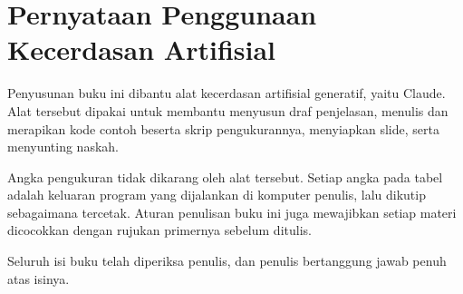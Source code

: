\chapter{Pernyataan Penggunaan Kecerdasan Artifisial}

Penyusunan buku ini dibantu alat kecerdasan artifisial generatif, yaitu Claude.
Alat tersebut dipakai untuk membantu menyusun draf penjelasan, menulis dan
merapikan kode contoh beserta skrip pengukurannya, menyiapkan slide, serta
menyunting naskah.

Angka pengukuran tidak dikarang oleh alat tersebut. Setiap angka pada tabel
adalah keluaran program yang dijalankan di komputer penulis, lalu dikutip
sebagaimana tercetak. Aturan penulisan buku ini juga mewajibkan setiap materi
dicocokkan dengan rujukan primernya sebelum ditulis.

Seluruh isi buku telah diperiksa penulis, dan penulis bertanggung jawab penuh
atas isinya.
